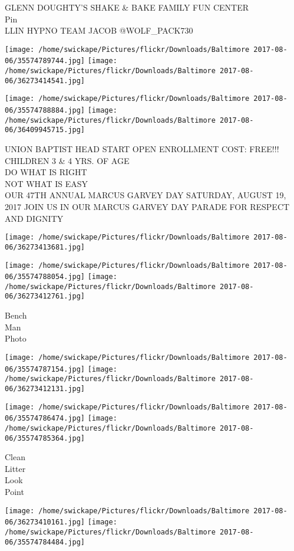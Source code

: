 \documentclass[10pt,letterpaper]{article}
\begin{document}
GLENN DOUGHTY'S SHAKE \& BAKE FAMILY FUN CENTER\\
Pin\\
LLIN HYPNO TEAM JACOB @WOLF\_PACK730
\pagebreak

\texttt{[image: /home/swickape/Pictures/flickr/Downloads/Baltimore 2017-08-06/35574789744.jpg]}
\texttt{[image: /home/swickape/Pictures/flickr/Downloads/Baltimore 2017-08-06/36273414541.jpg]}

\texttt{[image: /home/swickape/Pictures/flickr/Downloads/Baltimore 2017-08-06/35574788884.jpg]}
\texttt{[image: /home/swickape/Pictures/flickr/Downloads/Baltimore 2017-08-06/36409945715.jpg]}

UNION BAPTIST HEAD START OPEN ENROLLMENT COST: FREE!!! CHILDREN 3 \& 4 YRS. OF AGE\\
DO WHAT IS RIGHT\\
NOT WHAT IS EASY\\
OUR 47TH ANNUAL MARCUS GARVEY DAY SATURDAY, AUGUST 19, 2017 JOIN US IN OUR MARCUS GARVEY DAY PARADE FOR RESPECT AND DIGNITY
\pagebreak

\texttt{[image: /home/swickape/Pictures/flickr/Downloads/Baltimore 2017-08-06/36273413681.jpg]}

\vspace{0.25in}
\texttt{[image: /home/swickape/Pictures/flickr/Downloads/Baltimore 2017-08-06/35574788054.jpg]}
\texttt{[image: /home/swickape/Pictures/flickr/Downloads/Baltimore 2017-08-06/36273412761.jpg]}

Bench\\
Man\\
Photo
\pagebreak

\texttt{[image: /home/swickape/Pictures/flickr/Downloads/Baltimore 2017-08-06/35574787154.jpg]}
\texttt{[image: /home/swickape/Pictures/flickr/Downloads/Baltimore 2017-08-06/36273412131.jpg]}

\texttt{[image: /home/swickape/Pictures/flickr/Downloads/Baltimore 2017-08-06/35574786474.jpg]}
\texttt{[image: /home/swickape/Pictures/flickr/Downloads/Baltimore 2017-08-06/35574785364.jpg]}

Clean\\
Litter\\
Look\\
Point
\pagebreak

\texttt{[image: /home/swickape/Pictures/flickr/Downloads/Baltimore 2017-08-06/36273410161.jpg]}
\texttt{[image: /home/swickape/Pictures/flickr/Downloads/Baltimore 2017-08-06/35574784484.jpg]}
\end{document}
